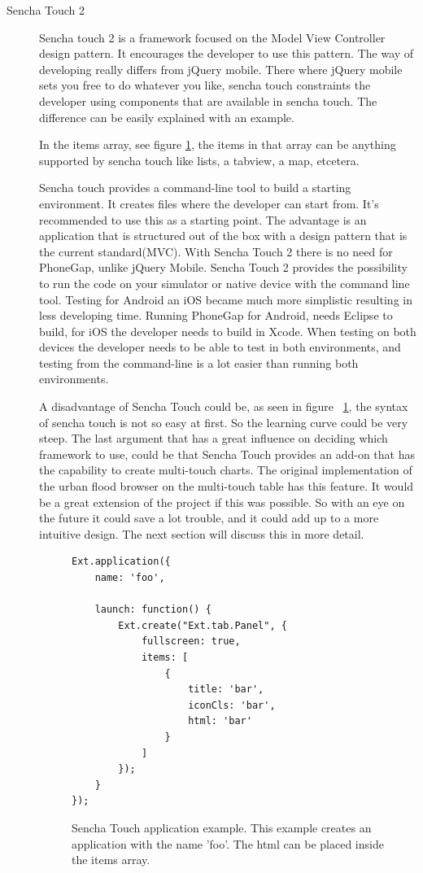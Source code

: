 \begin{description}
\item [Sencha Touch 2]
Sencha touch 2 is a framework focused on the Model View Controller design pattern. It encourages the developer to use this pattern. The way of developing really differs from jQuery mobile. There where jQuery mobile sets you free to do whatever you like, sencha touch constraints the developer using components that are available in sencha touch. The difference can be easily explained with an example.

In the items array, see figure \ref{fig:sencha}, the items in that array can be anything supported by sencha touch like lists, a tabview, a map, etcetera. 

Sencha touch provides a command-line tool to build a starting environment. It creates files where the developer can start from. It's recommended to use this as a starting point. The advantage is an application that is structured out of the box with a design pattern that is the current standard(MVC). With Sencha Touch 2 there is no need for PhoneGap, unlike jQuery Mobile. Sencha Touch 2 provides the possibility to run the code on your simulator or native device with the command line tool. Testing for Android an iOS became much more simplistic resulting in less developing time. Running PhoneGap for Android, needs Eclipse to build, for iOS the developer needs to build in Xcode. When testing on both devices the developer needs to be able to test in both environments, and testing from the command-line is a lot easier than running both environments. 

A disadvantage of Sencha Touch could be, as seen in figure ~\ref{fig:sencha}, the syntax of sencha touch is not so easy at first. So the learning curve could be very steep.
The last argument that has a great influence on deciding which framework to use, could be that Sencha Touch provides an add-on that has the capability to create multi-touch charts. The original implementation of the urban flood browser on the multi-touch table has this feature. It would be a great extension of the project if this was possible. So with an eye on the future it could save a lot trouble, and it could add up to a more intuitive design. The next section will discuss this in more detail.
\pagebreak
\begin{figure}[h!]
\begin{lstlisting}
Ext.application({
    name: 'foo',

    launch: function() {
        Ext.create("Ext.tab.Panel", {
            fullscreen: true,
            items: [
                {
                    title: 'bar',
                    iconCls: 'bar',
                    html: 'bar'
                }
            ]
        });
    }
});
\end{lstlisting}
\caption{Sencha Touch application example. This example creates an application with the name 'foo'.  The html can be placed inside the items array. }
\label{fig:sencha}
\end{figure}
\end{description}

